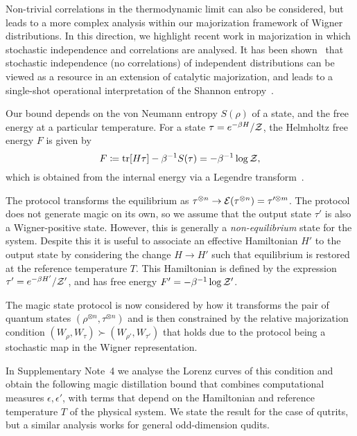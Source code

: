 \documentclass[
onecolumn,
superscriptaddress
]{revtex4-1}
\renewcommand{\tr}{{\rm{tr}}}
\def\Z{{\cal Z}}
\def\E{{\cal E}}
\begin{document}
Non-trivial correlations in the thermodynamic limit can also be considered, but leads to a more complex analysis within our majorization framework of Wigner distributions. In this direction, we highlight recent work in majorization in which stochastic independence and correlations are analysed. It has been shown~\cite{muller_2015} that stochastic independence (no correlations) of independent distributions can be viewed as a resource in an extension of catalytic majorization, and leads to a single-shot operational interpretation of the Shannon entropy~\cite{muller_2016, muller_2019}.

Our bound depends on the von Neumann entropy $S(\rho)$ of a state, and the free energy at a particular temperature.
For a state $\tau = e^{-\beta H}/\Z$, the Helmholtz free energy $F$ is given by
\begin{equation}
	F \coloneqq \tr[H \tau] - \beta^{-1}S(\tau) = -\beta^{-1}\log \Z,
\end{equation}
which is obtained from the internal energy via a Legendre transform~\cite{Pathria_1997}.

The protocol transforms the equilibrium as $\tau^{\otimes n} \rightarrow \E(\tau^{\otimes n}) = \tau^{\prime \otimes m}$.  The protocol does not generate magic on its own, so we assume that the output state $\tau'$ is also a Wigner-positive state. However, this is generally a \emph{non-equilibrium} state for the system. Despite this it is useful to associate an effective Hamiltonian $H'$ to the output state by considering the change $H \rightarrow H'$ such that equilibrium is restored at the reference temperature $T$. This Hamiltonian is defined by the expression $\tau' = e^{-\beta H'}/\Z'$, and has free energy $F' = -\beta^{-1} \log \Z'$. 


The magic state protocol is now considered by how it transforms the pair of quantum states $(\rho^{\otimes n}, \tau^{\otimes n})$ and is then constrained by the relative majorization condition $(W_{\rho}, W_\tau) \succ (W_{\rho'}, W_{\tau'})$ that holds due to the protocol being a stochastic map in the Wigner representation.

In Supplementary Note~4 we analyse the Lorenz curves of this condition and obtain the following magic distillation bound that combines computational measures $\epsilon,\epsilon'$, with terms that depend on the Hamiltonian and reference temperature $T$ of the physical system. We state the result for the case of qutrits, but a similar analysis works for general odd-dimension qudits.
\end{document}
